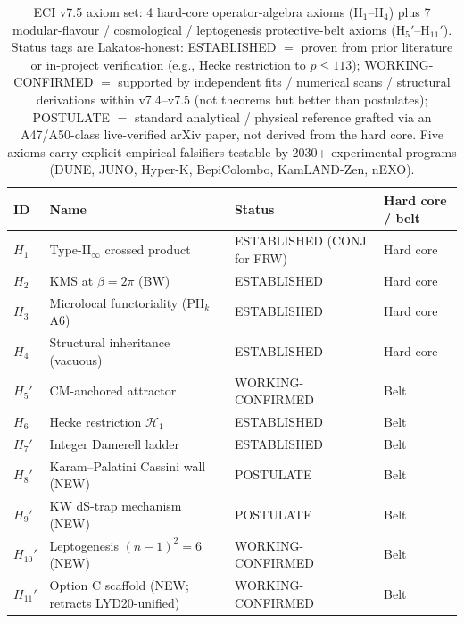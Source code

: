\begin{table}[ht]
\centering
\small
\begin{tabular}{llll}
\toprule
ID & Name & Status & Hard core / belt \\
\midrule
$H_1$  & Type-II$_\infty$ crossed product       & ESTABLISHED (CONJ for FRW)  & Hard core \\
$H_2$  & KMS at $\beta=2\pi$ (BW)               & ESTABLISHED                 & Hard core \\
$H_3$  & Microlocal functoriality (PH$_k$ A6)   & ESTABLISHED                 & Hard core \\
$H_4$  & Structural inheritance (vacuous)       & ESTABLISHED                 & Hard core \\
$H_5'$ & CM-anchored attractor                  & WORKING-CONFIRMED           & Belt \\
$H_6$  & Hecke restriction $\mathcal{H}_1$      & ESTABLISHED                 & Belt \\
$H_7'$ & Integer Damerell ladder                & ESTABLISHED                 & Belt \\
$H_8'$ & Karam--Palatini Cassini wall (NEW)     & POSTULATE                   & Belt \\
$H_9'$ & KW dS-trap mechanism (NEW)             & POSTULATE                   & Belt \\
$H_{10}'$ & Leptogenesis $(n-1)^2=6$ (NEW)      & WORKING-CONFIRMED           & Belt \\
$H_{11}'$ & Option C scaffold (NEW; retracts LYD20-unified) & WORKING-CONFIRMED & Belt \\
\bottomrule
\end{tabular}
\caption{ECI v7.5 axiom set: 4 hard-core operator-algebra axioms
(H$_1$--H$_4$) plus 7 modular-flavour / cosmological / leptogenesis
protective-belt axioms (H$_5'$--H$_{11}'$).  Status tags are
Lakatos-honest: ESTABLISHED $=$ proven from prior literature or
in-project verification (e.g., Hecke restriction to $p \le 113$);
WORKING-CONFIRMED $=$ supported by independent fits / numerical scans /
structural derivations within v7.4--v7.5 (not theorems but better than
postulates); POSTULATE $=$ standard analytical / physical reference
grafted via an A47/A50-class live-verified arXiv paper, not derived
from the hard core.  Five axioms carry explicit empirical falsifiers
testable by 2030+ experimental programs (DUNE, JUNO, Hyper-K,
BepiColombo, KamLAND-Zen, nEXO).}
\label{tab:axioms-lakatos}
\end{table}

